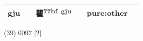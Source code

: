 \documentclass[14pt,a4paper]{scrartcl}
\begin{document}
\begin{longtable}[c]{@{}llllll@{}}
\begin{minipage}[t]{0.14\columnwidth}
gju
\strut\end{minipage} &
\begin{minipage}[t]{0.14\columnwidth}\raggedright\strut
\strut\end{minipage} &
\begin{minipage}[t]{0.14\columnwidth}\raggedright\strut
瞿\textsuperscript{77bf~gju}
\strut\end{minipage} &
\begin{minipage}[t]{0.14\columnwidth}\raggedright\strut
\strut\end{minipage} &
\begin{minipage}[t]{0.14\columnwidth}\raggedright\strut
pure:other
\strut\end{minipage}\tabularnewline
\bottomrule
\end{longtable}

(39) 0097 {[}2{]}
\end{document}

